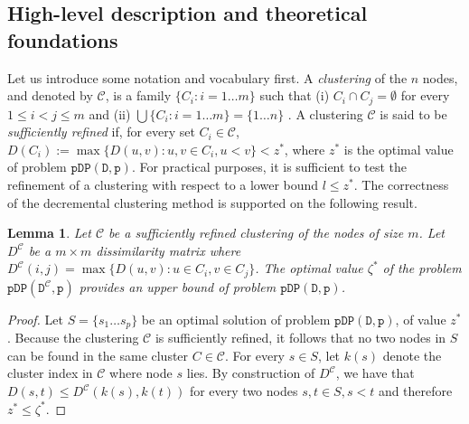 \documentclass[a4paper,10pt]{article}
\newtheorem{lemma}{\sffamily Lemma}
\newcommand{\pdp}[2]{$\mathtt{pDP({#1}, {#2})}$}
\newcommand{\mC}{\mathcal{C}}
\newcommand{\DmC}{D^{\mC}}
\begin{document}
\subsection{High-level description and theoretical foundations}

Let us introduce some notation and vocabulary first. A \textit{clustering} of the $n$ nodes, and denoted by $\mC$, is a family $\{C_i: i = 1 \ldots m\}$ such that (i) $C_i\cap C_j =\emptyset$ for every $1\leq i < j\leq m$ and (ii) $\bigcup\{C_i: i=1\ldots m\} = \{1\ldots n\}$ . A clustering $\mC$ is said to be \textit{sufficiently refined} if, for every set $C_i\in\mathcal{C}$, $D(C_i) := \max\{D(u, v): u, v\in C_i, u < v\} < z^*$, where $z^*$ is the optimal value of problem \pdp{D}{p}. For practical purposes, it is sufficient to test the refinement of a clustering with respect to a lower bound $l \leq z^*$. The correctness of the decremental clustering method is supported on the following result.

\begin{lemma}
	Let $\mC$ be a sufficiently refined clustering of the nodes of size $m$. Let $\DmC$ be a $m\times m$ dissimilarity matrix where $\DmC(i, j) = \max\{D(u, v): u\in C_i, v\in C_j\}$. The optimal value $\zeta^*$ of the problem \pdp{\DmC}{p} provides an upper bound of problem \pdp{D}{p}.
\end{lemma}
\begin{proof}
	Let $S = \{s_1\ldots s_p\}$ be an optimal solution of problem \pdp{D}{p}, of value $z^*$. Because the clustering $\mC$ is sufficiently refined, it follows that no two nodes in $S$ can be found in the same cluster $C\in\mC$. For every $s\in S$, let $k(s)$ denote the cluster index in $\mC$ where node $s$ lies. By construction of $\DmC$, we have that $D(s, t)\leq \DmC(k(s), k(t))$ for every two nodes $s, t\in S, s < t$ and therefore $z^* \leq \zeta^*$.
\end{proof}
\end{document}
